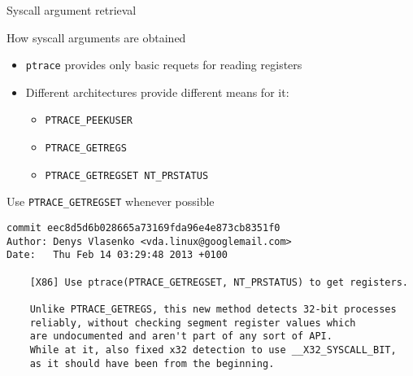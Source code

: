 \documentclass[unicode,aspectratio=169]{beamer}
\begin{document}
\begin{frame}[fragile]{Syscall argument retrieval}
\begin{block}{\large How syscall arguments are obtained}
\begin{itemize}
  \item \texttt{ptrace} provides only basic requets for reading registers\footnotemark[1]
  \item Different architectures provide different means for it:
  \begin{itemize}
    \item \texttt{PTRACE\_PEEKUSER}
    \item \texttt{PTRACE\_GETREGS}
    \item \texttt{PTRACE\_GETREGSET NT\_PRSTATUS}
  \end{itemize}
\end{itemize}
\end{block}
\pause
\begin{block}{\large Use \texttt{PTRACE\_GETREGSET} whenever possible}
\begin{scriptsize}
\begin{verbatim}
commit eec8d5d6b028665a73169fda96e4e873cb8351f0
Author: Denys Vlasenko <vda.linux@googlemail.com>
Date:   Thu Feb 14 03:29:48 2013 +0100

    [X86] Use ptrace(PTRACE_GETREGSET, NT_PRSTATUS) to get registers.
    
    Unlike PTRACE_GETREGS, this new method detects 32-bit processes
    reliably, without checking segment register values which
    are undocumented and aren't part of any sort of API.
    While at it, also fixed x32 detection to use __X32_SYSCALL_BIT,
    as it should have been from the beginning.
\end{verbatim}
\end{scriptsize}
\end{block}
\end{frame}
\end{document}

